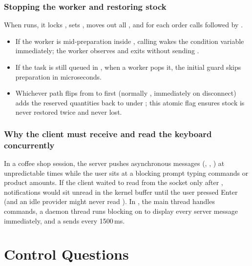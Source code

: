 \documentclass{../latex/utmreport}
\begin{document}
\subsection{Stopping the worker and restoring stock}
When  runs, it locks , sets , moves out all , and for each order calls  followed by .
\begin{itemize}
  \item If the worker is mid-preparation inside \allowbreak{}, calling  wakes the condition variable immediately; the worker observes \allowbreak{} and exits without sending .
  \item If the task is still queued in , when a worker pops it, the initial \allowbreak{} guard skips preparation in microseconds.
  \item Whichever path flips  from  to  first (normally , immediately on disconnect) adds the reserved quantities back to  under ; this atomic flag ensures stock is never restored twice and never lost.
\end{itemize}

\subsection{Why the client must receive and read the keyboard concurrently}
In a coffee shop session, the server pushes asynchronous messages (, , ) at unpredictable times while the user sits at a blocking prompt typing commands or product amounts. If the client waited to read from the socket only after , notifications would sit unread in the kernel buffer until the user pressed Enter (and an idle provider might never read ). In , the main thread handles  commands, a daemon thread runs  blocking on  to display every server message immediately, and a  sends  every 1500\,ms.

\chapter{Control Questions}
\end{document}
